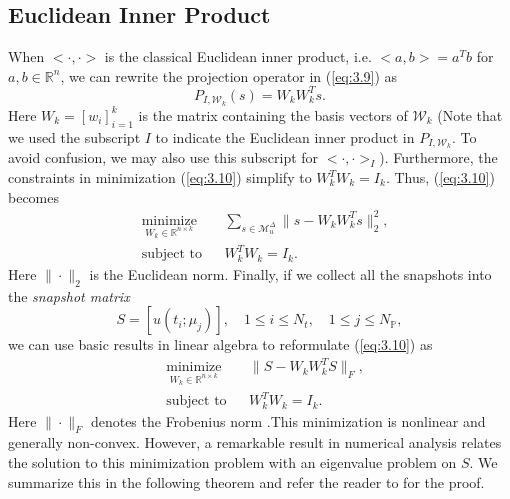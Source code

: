 \subsection{Euclidean Inner Product} \label{sec:3.2.1}
When $<\cdot,\cdot>$ is the classical Euclidean inner product, i.e. $<a,b> = a^Tb$ for $a,b\in \mathbb R^{n}$, we can rewrite the projection operator in (\ref{eq:3.9}) as
\begin{equation}
	P_{I,\mathcal W_k} (s) = W_kW_k^T s.
\end{equation}
Here $W_k = [w_i]_{i=1}^k$ is the matrix containing the basis vectors of $\mathcal W_k$ (Note that we used the subscript $I$ to indicate the Euclidean inner product in $P_{I,\mathcal W_k}$. To avoid confusion, we may also use this subscript for $<\cdot,\cdot>_I$). Furthermore, the constraints in minimization (\ref{eq:3.10}) simplify to $W_k^TW_k = I_k$. Thus, (\ref{eq:3.10}) becomes
\begin{equation} \label{eq:3.11}
\begin{aligned}
&  \underset{W_k\in\mathbb R^{n\times k}}{\text{minimize}}
& & \sum_{s\in \mathcal M_u^{\Delta}} \| s - W_kW_k^Ts\|^2_2, \\
& \text{subject to}
& & W_k^TW_k=I_k.
\end{aligned}
\end{equation}
Here $\|\cdot \|_2$ is the Euclidean norm. Finally, if we collect all the snapshots into the \emph{snapshot matrix}
\begin{equation} \label{eq:3.12}
	S = [u(t_i;\mu_j)],\quad 1\leq i \leq N_t,\quad 1 \leq j \leq N_{\mathbb P},
\end{equation}
we can use basic results in linear algebra \cite{trefethen97} to reformulate (\ref{eq:3.10}) as
\begin{equation} \label{eq:3.13}
\begin{aligned}
&  \underset{W_k\in\mathbb R^{n\times k}}{\text{minimize}}
& & \| S - W_kW_k^TS \|_F, \\
& \text{subject to}
& & W_k^TW_k=I_k.
\end{aligned}
\end{equation}
Here $\| \cdot \|_F$ denotes the Frobenius norm \cite{trefethen97}.This minimization is nonlinear and generally non-convex. However, a remarkable result in numerical analysis relates the solution to this minimization problem with an eigenvalue problem on $S$. We summarize this in the following theorem and refer the reader to \cite{Markovsky:2011:LRA:2103589} for the proof.
